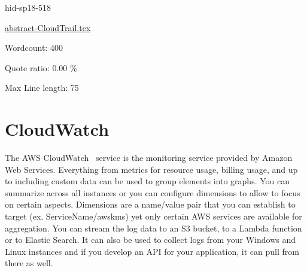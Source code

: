 


\begin{IU}

hid-sp18-518

\href{https://github.com/cloudmesh-community/hid-sp18-518/blob/master//technology/abstract-CloudTrail.tex}{abstract-CloudTrail.tex}

 

Wordcount: 400


Quote ratio: 0.00 \%
 
Max Line length: 75
\end{IU}

\section{CloudWatch}

The AWS CloudWatch~\cite{hid-sp18-518-CloudWatch} service is the monitoring 
service provided by Amazon Web Services. Everything from metrics for resource
usage, billing usage, and up to including custom data can be used to 
group elements into graphs. You can summarize across all instances or you
can configure dimensions to allow to focus on certain aspects. Dimensions are
a name/value pair that you can establish to target (ex. ServiceName/awskms) yet
only certain AWS services are available for aggregation. You can stream the 
log data to an S3 bucket, to a Lambda function or to Elastic Search. It can 
also be used to collect logs from your Windows and Linux instances and if
you develop an API for your application, it can pull from there as well.





